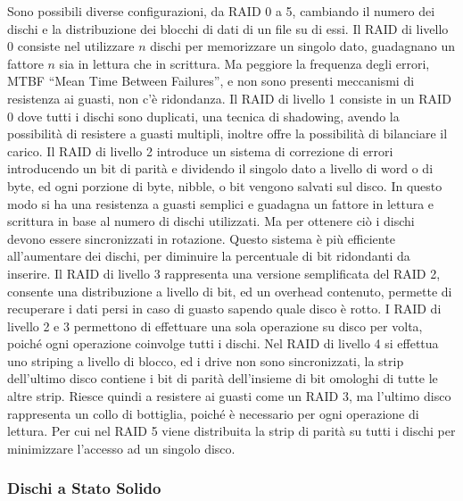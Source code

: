 \documentclass{article}
\numberwithin{equation}{subsection}
\begin{document}
Sono possibili diverse configurazioni, da RAID 0 a 5, cambiando il numero dei dischi e la distribuzione dei blocchi di dati di un file su di essi. Il RAID di livello 0 consiste nel utilizzare $n$ dischi 
per memorizzare un singolo dato, guadagnano un fattore $n$ sia in lettura che in scrittura. Ma peggiore la frequenza degli errori, MTBF ``Mean Time Between Failures'', e non sono presenti meccanismi di 
resistenza ai guasti, non c'è ridondanza. 
Il RAID di livello 1 consiste in un RAID 0 dove tutti i dischi sono duplicati, una tecnica di shadowing, avendo la possibilità di resistere a guasti multipli, inoltre offre la possibilità di bilanciare il carico. 
Il RAID di livello 2 introduce un sistema di correzione di errori introducendo un bit di parità e dividendo il singolo dato a livello di word o di byte, ed ogni porzione di byte, nibble, o bit vengono salvati sul disco. In questo modo si ha 
una resistenza a guasti semplici e guadagna un fattore in lettura e scrittura in base al numero di dischi utilizzati. Ma per ottenere ciò i dischi devono essere sincronizzati in rotazione. Questo sistema è più efficiente all'aumentare dei 
dischi, per diminuire la percentuale di bit ridondanti da inserire. 
Il RAID di livello 3 rappresenta una versione semplificata del RAID 2, consente una distribuzione a livello di bit, ed un overhead contenuto, permette di recuperare i dati persi in caso di guasto sapendo quale 
disco è rotto. 
I RAID di livello 2 e 3 permettono di effettuare una sola operazione su disco per volta, poiché ogni operazione coinvolge tutti i dischi.  
Nel RAID di livello 4 si effettua uno striping a livello di blocco, ed i drive non sono sincronizzati, la strip dell'ultimo disco contiene i bit di parità dell'insieme di bit omologhi di tutte le altre strip. Riesce 
quindi a resistere ai guasti come un RAID 3, ma l'ultimo disco rappresenta un collo di bottiglia, poiché è necessario per ogni operazione di lettura. Per cui nel RAID 5 viene distribuita la strip di parità su tutti i 
dischi per minimizzare l'accesso ad un singolo disco. 

\subsubsection{Dischi a Stato Solido}
\end{document}

